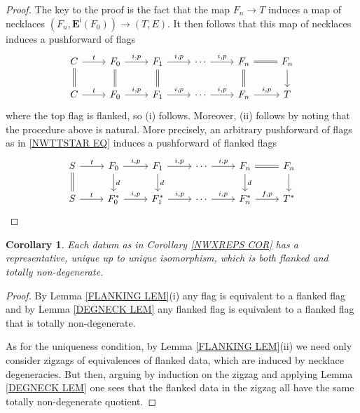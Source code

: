 \documentclass[a4paper,10pt
,draft
]{article}%
\numberwithin{equation}{section}
\numberwithin{figure}{section}
\newtheorem{corollary}[equation]{Corollary}%
\theoremstyle{definition} %
\newcommand{\1}{\ensuremath{\mathbbm 1}}%
\begin{document}
\begin{proof}
	The key to the proof is the fact that 
	the map $F_n \to T$
	induces a map of necklaces
	$(F_n,\boldsymbol{E}^{\mathsf{i}}(F_0)) \to (T,E)$.
	It then follows that this map of necklaces induces a pushforward of flags
	\begin{equation}
	\begin{tikzcd}
	C \ar{r}{t} \ar[equal]{d}
	&
	F_0 \ar{r}{i,p} \ar[equal]{d}
	&
	F_1 \ar{r}{i,p} \ar[equal]{d}
	&
	\cdots
	\ar{r}{i,p}
	&
	F_n \ar[equal]{r} \ar[equal]{d}
	&
	F_n \ar{d}
	\\
	C \ar{r}{t}
	&
	F_0 \ar{r}{i,p}
	&
	F_1 \ar{r}{i,p}
	&
	\cdots
	\ar{r}{i,p}
	&
	F_n \ar{r}{i,p}
	&
	T
	\end{tikzcd}
	\end{equation}	
	where the top flag is flanked, so (i) follows.
	Moreover, (ii) follows by noting that the procedure above is natural.
	More precisely, 
	an arbitrary pushforward of flags as in 
	\eqref{NWTTSTAR EQ}
	induces a pushforward of flanked flags
	\begin{equation}
	\begin{tikzcd}
	S \ar{r}{t} \ar[equal]{d}
	&
	F_0 \ar{r}{i,p} \ar{d}{d}
	&
	F_1 \ar{r}{i,p} \ar{d}{d}
	&
	\cdots \ar{r}{i,p}
	&
	F_n \ar[equal]{r} \ar{d}{d}
	&
	F_n \ar{d}
	\\
	S \ar{r}{t} 
	&
	F^{\**}_0 \ar{r}{i,p}
	&
	F^{\**}_1 \ar{r}{i,p}
	&
	\cdots \ar{r}{i,p}
	&
	F^{\**}_n \ar{r}{f,p}
	&
	T^{\**}
	\end{tikzcd}
	\end{equation}
\end{proof}



\begin{corollary}
	Each datum as in Corollary \ref{NWXREPS COR}
	has a representative, unique up to unique isomorphism,
	which is both flanked and totally non-degenerate.
\end{corollary}



\begin{proof}
	By Lemma \ref{FLANKING LEM}(i)
	any flag is equivalent to a flanked flag
	and by Lemma \ref{DEGNECK LEM}
	any flanked flag is equivalent to a flanked flag that is
	totally non-degenerate.
	
	As for the uniqueness condition, 
	by Lemma \ref{FLANKING LEM}(ii)
	we need only consider zigzags of 
	equivalences of flanked data, 
	which are induced by necklace degeneracies.
	But then, arguing by induction on the zigzag
	and applying 
	Lemma \ref{DEGNECK LEM}
	one sees that the flanked data in the zigzag all have the same
	totally non-degenerate quotient.
\end{proof}
\end{document}
